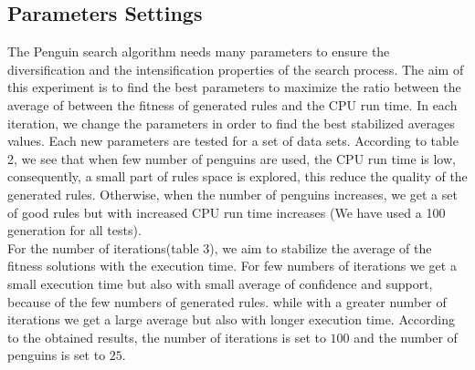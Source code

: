 \documentclass[preprint,12pt]{elsarticle}
\begin{document}
\subsection{Parameters Settings}
The Penguin search algorithm needs many parameters to ensure the diversification and the intensification properties of the search
process. The aim of this experiment is to find the best parameters to maximize the ratio 
between the average of between the fitness of generated rules and the CPU run time. 
In each iteration, we change the parameters in order to find the best stabilized averages values. Each new parameters are tested for a set of  data sets. According to table 2, we see that when few number of penguins are used, the CPU run time is low, consequently, 
a small part of rules space is explored, this reduce the quality of the generated rules. Otherwise, when the number of penguins 
increases, we get a set of good rules but with increased CPU run time increases (We have used a 100 generation for all tests).\\
For the number of iterations(table 3), we aim to stabilize the average of the fitness solutions with the execution time. For few numbers of iterations 
we get a small execution time but also with small average of confidence and support, because of the few numbers of generated rules.
while with a greater number of iterations we get a large average but also with longer execution time. According to the obtained results, 
the number of iterations is set to $100$ and the number of penguins is set to $25$.
\end{document}
